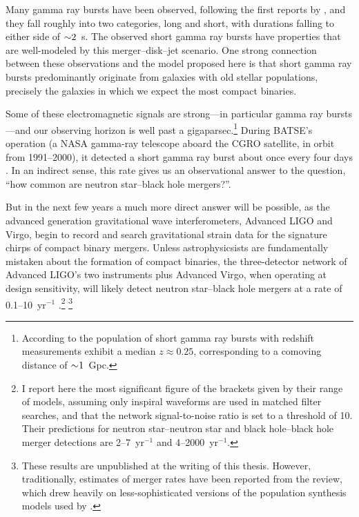 \begin{itemize}
    Many gamma ray bursts have been observed, following the first reports by
    \citet{kleb1973-first_report_grb}, and they fall roughly into two categories,
    long and short, with durations falling to either side of $\mathord{\sim}2$~s.
    The observed short gamma ray bursts have
    properties that are well-modeled by this merger--disk--jet scenario.
    One strong connection between these observations and the model proposed here
    is that short gamma ray bursts predominantly originate from galaxies with
    old stellar populations, precisely the galaxies in which we expect the most
    compact binaries.
\end{itemize}
Some of these electromagnetic signals are strong---in particular gamma ray
bursts---and our observing horizon is well past a gigaparsec.\footnote{
According to \citet{naka2007-review_sgrb} the population of short gamma ray
bursts with redshift measurements exhibit a median $z\approx0.25$, corresponding
to a comoving distance of $\mathord{\sim}1$~Gpc.}
During BATSE's operation (a NASA gamma-ray telescope aboard the CGRO satellite,
in orbit from 1991--2000), it detected a short gamma ray burst about once every
four days \citep{naka2007-review_sgrb}.
In an indirect sense, this rate gives us an observational answer to the question,
``how common are neutron star--black hole mergers?''.

But in the next few years a much more direct answer will be possible, as the
advanced generation gravitational wave interferometers, Advanced LIGO and Virgo,
begin to record and search gravitational strain data for the signature chirps of
compact binary mergers. Unless astrophysicsists are fundamentally
mistaken about the formation of compact binaries, the three-detector network of
Advanced LIGO's two instruments plus Advanced Virgo, when operating at design
sensitivity, will likely detect neutron star--black hole \nsbh mergers at a
rate of 0.1--10~yr$^{-1}$
\citep[Tables~2 and~3]{domi2014-merger_rates_part3}.\footnote{
I report here the most significant figure of the brackets given by their range
of models, assuming only inspiral waveforms are used in matched filter searches,
and that the network signal-to-noise ratio is set to a threshold of 10.
Their predictions for neutron star--neutron star \nsns
and black hole--black hole \bhbh merger detections are
2--7~yr$^{-1}$ and 4--2000~yr$^{-1}$.}
\footnote{
These results are unpublished at the writing of this thesis.
However, traditionally, estimates of merger rates have been reported from the
\citet{abad2010-rates} review, which drew heavily on less-sophisticated versions
of the population synthesis models used by \citet{domi2014-merger_rates_part3}.}

